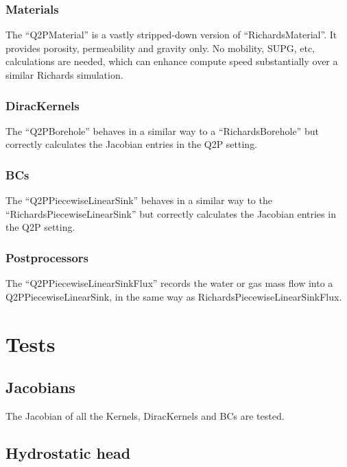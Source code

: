 \documentclass[]{scrreprt}
\begin{document}
\subsection{Materials}

The ``Q2PMaterial'' is a vastly stripped-down version of
``RichardsMaterial''.  It provides porosity, permeability and gravity
only.  No mobility, SUPG, etc, calculations are needed, which can
enhance compute speed substantially over a similar Richards
simulation.



\subsection{DiracKernels}

The ``Q2PBorehole'' behaves in a similar way to a
``RichardsBorehole'' but correctly calculates the Jacobian entries in
the Q2P setting.



\subsection{BCs}

The ``Q2PPiecewiseLinearSink'' behaves in a similar way to the
``RichardsPiecewiseLinearSink'' but correctly calculates the Jacobian
entries in the Q2P setting.


\subsection{Postprocessors}

The ``Q2PPiecewiseLinearSinkFlux'' records the water or gas mass flow
into a Q2PPiecewiseLinearSink, in the same way as
RichardsPiecewiseLinearSinkFlux.



\chapter{Tests}

\section{Jacobians}

The Jacobian of all the Kernels, DiracKernels and BCs are tested.

\section{Hydrostatic head}
\end{document}
